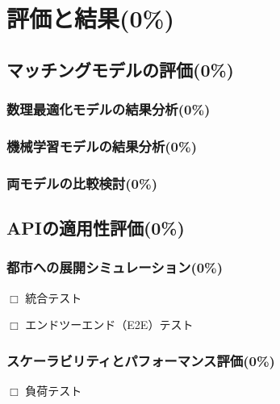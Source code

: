 \section{評価と結果(0\%)}
  \label{sec:評価と結果}
    \par
  
  \subsection{マッチングモデルの評価(0\%)}
    \label{sec:マッチングモデルの評価}
      \par
  
      \subsubsection{数理最適化モデルの結果分析(0\%)}
        \label{sec:数理最適化モデルの結果分析}
          \par
          
      \subsubsection{機械学習モデルの結果分析(0\%)}
        \label{sec:機械学習モデルの結果分析}
          \par
          
      \subsubsection{両モデルの比較検討(0\%)}
        \label{sec:両モデルの比較検討}
          \par
      
  \subsection{APIの適用性評価(0\%)}
    \label{sec:APIの適用性評価}
      \par
      
      \subsubsection{都市への展開シミュレーション(0\%)}
        \label{sec:都市への展開シミュレーション}
          \par $\Box$ 統合テスト
          \par $\Box$ エンドツーエンド（E2E）テスト
          
      \subsubsection{スケーラビリティとパフォーマンス評価(0\%)}
        \label{sec:スケーラビリティとパフォーマンス評価}
          \par $\Box$ 負荷テスト

